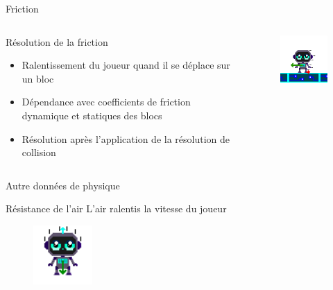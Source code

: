 \documentclass{beamer}
\begin{document}
{\begin{frame}{Friction}
    \begin{columns}
        \begin{block}{Résolution de la friction}
            \begin{itemize}
                \item[\bullet] Ralentissement du joueur quand il se déplace sur un bloc
                \item[\bullet] Dépendance avec coefficients de friction dynamique et statiques des blocs
                \item[\bullet] Résolution après l'application de la résolution de collision
            \end{itemize}
        \end{block}
        \begin{figure}
            \centering
            \includegraphics[width=1.0\textwidth]{images/Friction.png}
        \end{figure}
    \end{columns}
\end{frame}

\begin{frame}{Autre données de physique}
    \begin{block}{Résistance de l'air}
        L'air ralentis la vitesse du joueur
        \begin{figure}
            \centering
            \includegraphics[width=0.2\textwidth]{images/Airresistance.png}
        \end{figure}
    \end{block}


\end{frame}}
\end{document}
